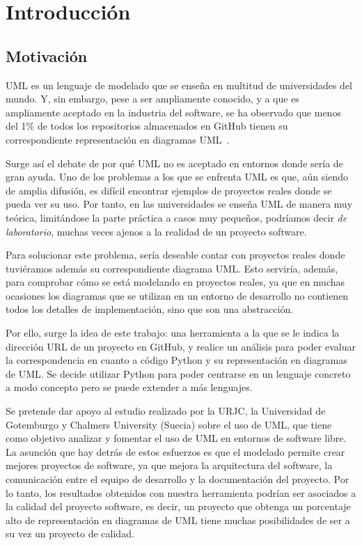 \documentclass[a4paper, 12pt]{book}
\begin{document}
\cleardoublepage
\chapter{Introducción}
\label{sec:intro} %

\section{Motivación}
\label{sec:motivacion}

UML es un lenguaje de modelado que se enseña en multitud de universidades del mundo. Y, sin embargo, pese a ser ampliamente conocido, y a que es ampliamente aceptado en la industria del software, se ha observado que menos del 1\% de todos los repositorios almacenados en GitHub tienen su correspondiente representación en diagramas UML~\cite{hebig2016quest}.

Surge así el debate de por qué UML no es aceptado en entornos donde sería de gran ayuda. Uno de los problemas a los que se enfrenta UML es que, aún siendo de amplia difusión, es difícil encontrar ejemplos de proyectos reales donde se pueda ver su uso. Por tanto, en las universidades se enseña UML de manera muy teórica, limitándose la parte práctica a casos muy pequeños, podríamos decir \emph{de laboratorio}, muchas veces ajenos a la realidad de un proyecto software.

Para solucionar este problema, sería deseable contar con proyectos reales donde tuviéramos además su correspondiente diagrama UML. Esto serviría, además, para comprobar cómo se está modelando en proyectos reales, ya que en muchas ocasiones los diagramas que se utilizan en un entorno de desarrollo no contienen todos los detalles de implementación, sino que son una abstracción.

Por ello, surge la idea de este trabajo: una herramienta a la que se le indica la dirección URL de un proyecto en GitHub, y realice un análisis para poder evaluar la correspondencia en cuanto a código Python y su representación en diagramas de UML. Se decide utilizar Python para poder centrarse en un lenguaje concreto a modo concepto pero se puede extender a más lenguajes.

Se pretende dar apoyo al estudio realizado por la URJC, la Universidad de Gotemburgo y Chalmers University (Suecia) sobre el uso de UML, que tiene como objetivo analizar y fomentar el uso de UML en entornos de software libre. La asunción que hay detrás de estos esfuerzos es que el modelado permite crear mejores proyectos de software, ya que mejora la arquitectura del software, la comunicación entre el equipo de desarrollo y la documentación del proyecto. Por lo tanto, los resultados obtenidos con nuestra herramienta podrían ser asociados a la calidad del proyecto software, es decir, un proyecto que obtenga un porcentaje alto de representación en diagramas de UML tiene muchas posibilidades de ser a su vez un proyecto de calidad.
\end{document}
